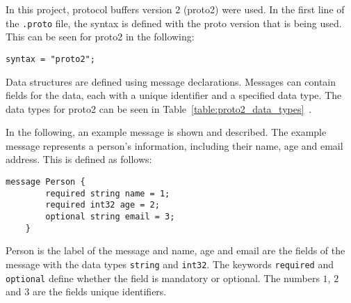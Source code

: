 \documentclass[../MasterThesis.tex]{subfiles}
\begin{document}
In this project, protocol buffers version 2 (proto2) were used. In the first line of the \texttt{.proto} file, the syntax is defined with the proto version that is being used. This can be seen for proto2 in the following:

\begin{lstlisting}[style=protobufStyle, numbers=none]
	syntax = "proto2";
\end{lstlisting}

\begin{description}[font=\normalfont\color{RedViolet!80!black}, style=nextline]
	

\item[Messages and Fields] 

Data structures are defined using message declarations. Messages can contain fields for the data, each with a unique identifier and a specified data type. The data types for proto2 can be seen in Table~\ref{table:proto2_data_types}~\cite{proto2_doc}.

In the following, an example message is shown and described.
The example message represents a person's information, including their name, age and email address. This is defined as follows:

\begin{lstlisting}[style=protobufStyle, numbers=none]
	message Person {
		required string name = 1;
		required int32 age = 2;
		optional string email = 3;
	}
\end{lstlisting}

Person is the label of the message and name, age and email are the fields of the message with the data types \texttt{string} and \texttt{int32}.
The keywords \texttt{required} and \texttt{optional} define whether the field is mandatory or optional.
The numbers $1$, $2$ and $3$ are the fields unique identifiers.



\end{description}
\end{document}
